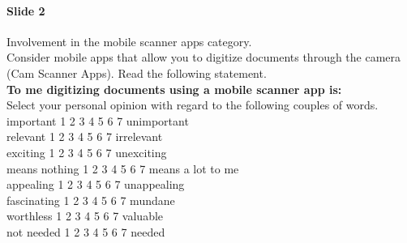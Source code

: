 \paragraph{Slide 2} Involvement in the mobile scanner apps category.\\
Consider mobile apps that allow you to digitize documents through the camera (Cam Scanner Apps). Read the following statement.\\
\textbf{To me digitizing documents using a mobile scanner app is:}\\
Select your personal opinion with regard to the following couples of words. \\
important {\huge \Square} 1  {\huge \Square} 2 {\huge \Square} 3 {\huge \Square} 4 {\huge \Square} 5 {\huge \Square} 6 {\huge \Square} 7 unimportant\\
relevant {\huge \Square} 1  {\huge \Square} 2 {\huge \Square} 3 {\huge \Square} 4 {\huge \Square} 5 {\huge \Square} 6 {\huge \Square} 7 irrelevant\\
exciting {\huge \Square} 1  {\huge \Square} 2 {\huge \Square} 3 {\huge \Square} 4 {\huge \Square} 5 {\huge \Square} 6 {\huge \Square} 7 unexciting\\
means nothing {\huge \Square} 1  {\huge \Square} 2 {\huge \Square} 3 {\huge \Square} 4 {\huge \Square} 5 {\huge \Square} 6 {\huge \Square} 7 means a lot to me\\
appealing {\huge \Square} 1  {\huge \Square} 2 {\huge \Square} 3 {\huge \Square} 4 {\huge \Square} 5 {\huge \Square} 6 {\huge \Square} 7 unappealing\\
fascinating {\huge \Square} 1  {\huge \Square} 2 {\huge \Square} 3 {\huge \Square} 4 {\huge \Square} 5 {\huge \Square} 6 {\huge \Square} 7 mundane\\
worthless {\huge \Square} 1  {\huge \Square} 2 {\huge \Square} 3 {\huge \Square} 4 {\huge \Square} 5 {\huge \Square} 6 {\huge \Square} 7 valuable\\
not needed {\huge \Square} 1  {\huge \Square} 2 {\huge \Square} 3 {\huge \Square} 4 {\huge \Square} 5 {\huge \Square} 6 {\huge \Square} 7 needed

